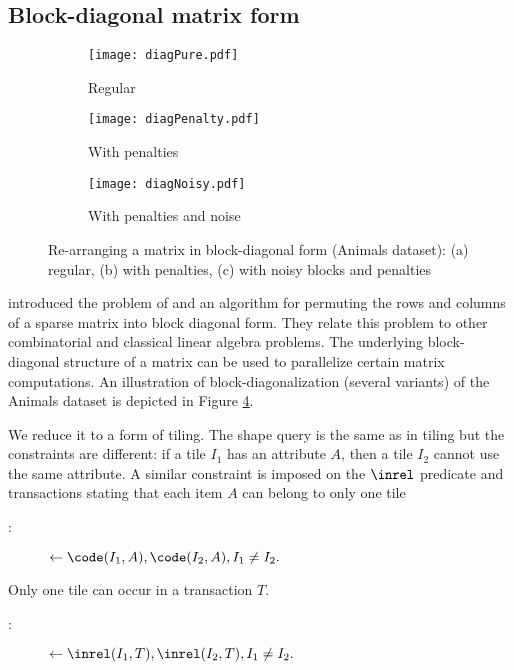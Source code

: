 \subsection{Block-diagonal matrix form}\label{subsec:blockdiagonal}
\begin{figure}[t]
\begin{center}
\begin{subfigure}{.32\textwidth}
  \texttt{[image: diagPure.pdf]}
  \captionsetup{skip=-5pt}
  \caption{Regular}
  \label{fig:regular_block_diagonal}
\end{subfigure}
   \hfill 
\begin{subfigure}{.32\textwidth}
  \texttt{[image: diagPenalty.pdf]}
  \captionsetup{skip=-5pt}
  \caption{With penalties}
  \label{fig:penalty_block_diagonal}
\end{subfigure}
\begin{subfigure}{.32\textwidth}
  \texttt{[image: diagNoisy.pdf]}
  \captionsetup{skip=-5pt}
  \caption{With penalties and noise}
  \label{fig:noisy_block_diagonal}
\end{subfigure}
\end{center}
\captionsetup{skip=-8pt}
\caption{Re-arranging a matrix in block-diagonal form (Animals dataset): (a) regular, (b) with penalties, (c) with noisy blocks and penalties}
\label{fig:diag_examples}
\end{figure}

\cite{blockdiagonal} introduced the problem of and an algorithm for permuting the rows and columns of a sparse matrix into block diagonal form. 
They relate this problem to other combinatorial and classical linear algebra problems. The underlying block-diagonal structure of a matrix can be used to parallelize certain matrix computations. An illustration of block-diagonalization (several variants) of the Animals dataset is depicted in Figure \ref{fig:diag_examples}.

We reduce it to a form of tiling. The shape query is the same as in tiling but the constraints are different: if a tile $I_1$ has an attribute $A$, then a tile $I_2$ cannot use the same attribute. A similar constraint is imposed on the $\inrel$ predicate and transactions stating that each item $A$ can belong to only one tile
\begin{description}
\item[\blockedItems:] $\leftarrow \code(I_1,A), \code(I_2,A), I_1 \neq I_2. $
\end{description}
Only one tile can occur in a transaction $T$.
\begin{description}
\item[\blockedTranst:] $\leftarrow  \inrel(I_1,T), \inrel(I_2,T), I_1 \neq I_2. $
\end{description}

